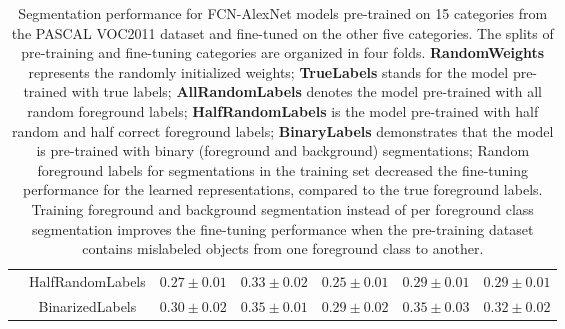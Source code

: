 \begin{table}[t]
{\begin{tabular}{l|c|cccc|c}
                                                                                      & HalfRandomLabels                                                    & $0.27\pm0.01$                                                                                           & $0.33\pm0.02$                                                                               & $0.25\pm0.01$                                                                                                  & $0.29\pm0.01$                                                                                           & $0.29\pm0.01$                                                                                                          \\
                                                                                      & BinarizedLabels                                                     & $0.30\pm0.02$                                                                                           & $0.35\pm0.01$                                                                               & $0.29\pm0.02$                                                                                                  & $0.35\pm0.03$                                                                                           & $\mathbf{0.32\pm0.02}$                                                                                                 \\ \hline

\end{tabular}
}
\caption{
Segmentation performance for FCN-AlexNet models pre-trained on 15 categories from the PASCAL VOC2011 dataset and fine-tuned on the other five categories.
The splits of pre-training and fine-tuning categories are organized in four folds.
\textbf{RandomWeights} represents the randomly initialized weights;
\textbf{TrueLabels} stands for the model pre-trained with true labels;
\textbf{AllRandomLabels} denotes the model pre-trained with all random foreground labels;
\textbf{HalfRandomLabels} is the model pre-trained with half random and half correct foreground labels;
\textbf{BinaryLabels} demonstrates that the model is pre-trained with binary (foreground and background) segmentations;
Random foreground labels for segmentations in the training set decreased the fine-tuning performance for the learned representations, compared to the true foreground labels.
Training foreground and background segmentation instead of per foreground class segmentation improves the fine-tuning performance when the pre-training dataset contains mislabeled objects from one foreground class to another.
}
\label{tab:random}
\end{table}




